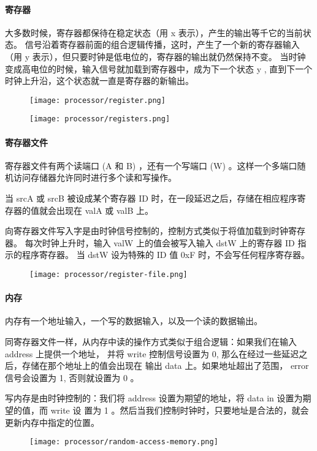 \paragraph{寄存器}
大多数时候，寄存器都保待在稳定状态（用 x 表示），产生的输出等千它的当前状态。
信号沿着寄存器前面的组合逻辑传播，这时，产生了一个新的寄存器输入（用 y 表示），但只要时钟是低电位的，寄存器的输出就仍然保持不变。
当时钟变成高电位的时候，输入信号就加载到寄存器中，成为下一个状态 y , 直到下一个时钟上升沿，这个状态就一直是寄存器的新输出。
\begin{figure}[H]
    \centering
    \texttt{[image: processor/register.png]}
\end{figure}
\begin{figure}[H]
    \centering
    \texttt{[image: processor/registers.png]}
\end{figure}

\paragraph{寄存器文件}
寄存器文件有两个读端口 (A 和 B) ，还有一个写端口 (W) 。这样一个多端口随机访问存储器允许同时进行多个读和写操作。

当 srcA 或 srcB 被设成某个寄存器 ID 时，在一段延迟之后，存储在相应程序寄存器的值就会出现在 valA 或 valB 上。

向寄存器文件写入字是由时钟信号控制的，控制方式类似于将值加载到时钟寄存器。
每次时钟上升时，输入 valW 上的值会被写入输入 dstW 上的寄存器 ID 指示的程序寄存器。
当 dstW 设为特殊的 ID 值 0xF 时，不会写任何程序寄存器。
\begin{figure}[H]
    \centering
    \texttt{[image: processor/register-file.png]}
\end{figure}

\paragraph{内存}

内存有一个地址输入，一个写的数据输入，以及一个读的数据输出。

同寄存器文件一样，从内存中读的操作方式类似于组合逻辑：如果我们在输入 address 上提供一个地址，
并将 write 控制信号设置为 0, 那么在经过一些延迟之后，存储在那个地址上的值会出现在
输出 data 上。如果地址超出了范围， error 信号会设置为 1, 否则就设置为 0 。

写内存是由时钟控制的：我们将 address 设置为期望的地址，将 data in 设置为期望的值，而 write 设
置为 1 。然后当我们控制时钟时，只要地址是合法的，就会更新内存中指定的位置。
\begin{figure}[H]
    \centering
    \texttt{[image: processor/random-access-memory.png]}
\end{figure}

